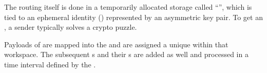The routing itself is done in a temporarily allocated storage called ``'', which is tied to an ephemeral identity () represented by an asymmetric key pair. To get an , a sender typically solves a crypto puzzle. 

Payloads of \VortexMessages{} are mapped into the  and are assigned a unique  within that workspace. The subsequent s and their s are added as well and processed in a time interval defined by the .


